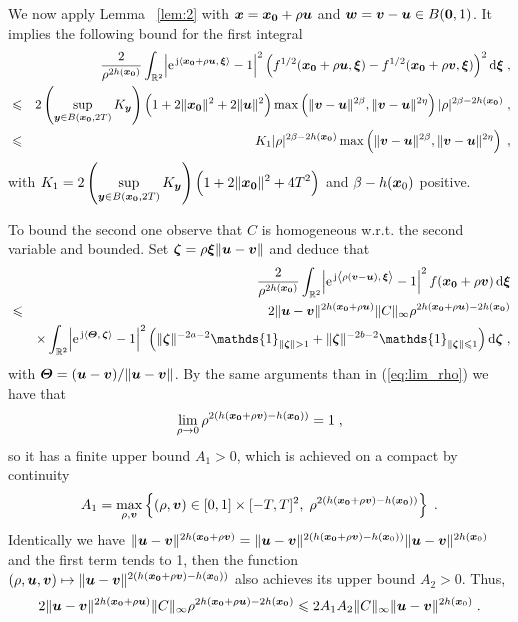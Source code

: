 \documentclass{elsarticle}
\begin{document}
We now apply Lemma~ \ref{lem:2} with $\bm{x}=\bm{x_0}+\rho\bm{u}$ and $\bm{w}=\bm{v}-\bm{u}\in B(\bm{0},1)$. It implies the following bound for the first integral
\begin{eqnarray}
&&\frac{2}{\rho^{2h(\bm{x_0})}}\int_{ \mathbb{R}^2}^{} \abs{\mathrm{e}^{\, \mathrm{j} \left \langle \bm{x_0}+\rho \bm{u},\, \bm{\xi}\right \rangle}-1}^2\left(f^{1/2}(\bm{x_0}+\rho \bm{u},\bm{\xi})-f^{1/2}(\bm{x_0}+\rho \bm{v},\bm{\xi})\right)^2\mathop{}\mathopen{}\mathrm{d} \bm{\xi}\;,\nonumber\\
&\leqslant& 2\left(\sup_{\bm{y}\in B(\bm{x_0},2T)}K_{\bm{y}}\right)\left(1+2\|\bm{x_0}\|^2+2\|\bm{u}\|^2\right)\max\left(\|\bm{v}-\bm{u}\|^{2\beta},\|\bm{v}-\bm{u}\|^{2\eta}\right)|\rho|^{2\beta-2h(\bm{x_0})}\;,\nonumber\\
&\leqslant & K_1 |\rho|^{2\beta-2h(\bm{x_0})} \max\left(\|\bm{v}-\bm{u}\|^{2\beta},\|\bm{v}-\bm{u}\|^{2\eta}\right)\;,\label{e:K1}
\end{eqnarray}
with $\displaystyle K_1=2\left(\sup_{\bm{y}\in B(\bm{x_0},2T)}K_{\bm{y}}\right)\left(1+2\|\bm{x_0}\|^2+4T^2\right)$ and $\beta-h(\bm{x}_0)$ positive.


To bound the second one observe that $C$ is homogeneous w.r.t. the second variable and bounded. Set $\bm{\zeta}=\rho\bm{\xi}\|\bm{u}-\bm{v}\|$ and deduce that
\begin{eqnarray*}
&& \frac{2}{\rho^{2h(\vect{x_0})}} \int_{ \mathbb{R}^2} \abs{\expj{\ip{\rho (\vect{v}-\vect{u})}{\vect{\xi}}}-1}^2 f(\vect{x_0}+\rho \vect{v})\diff \vect{\xi}\\
&\leq& 2\|\vect{u}-\vect{v}\|^{2h(\vect{x_0}+\rho \vect{u})}\|C\|_\infty \rho^{2h(\vect{x_0}+\rho\vect{u})-2h(\vect{x_0})}\\
&&\times \int_{ \mathbb{R}^2} \abs{\expj{\ip{\vect{\Theta}}{\vect{\zeta}}}-1}^2\left(\|\vect{\zeta}\|^{-2a-2} \mathds{1}_{\|\vect{\zeta}\|>1}+\|\vect{\zeta}\|^{-2b-2} \mathds{1}_{\|\vect{\zeta}\|\leq 1}\right)\diff \vect{\zeta}\;,
\end{eqnarray*}
with $\bm{\Theta}=(\bm{u}-\bm{v})/\|\bm{u}-\bm{v}\|$. By the same arguments than in (\ref{eq:lim_rho}) we have that 
\[
\lim_{\rho\to 0} \rho^{2(h(\bm{x_0}+\rho \bm{v})-h(\bm{x_0}))}=1\;,
\]
so it has a finite upper bound $A_1>0$, which is achieved on a compact by continuity
\[
A_1=\max_{\rho, \bm{v}} \left\{(\rho,\bm{v})\in [0,1]\times [-T,T]^2,\; \rho^{2(h(\bm{x_0}+\rho \bm{v})-h(\bm{x_0}))}\right\}\;.
\]
Identically we have $\lVert \bm{u}-\bm{v}\rVert^{2h(\bm{x_0}+\rho \bm{v})}=\lVert \bm{u}-\bm{v}\rVert^{2(h(\bm{x_0}+\rho \bm{v})-h(\bm{x}_0))}\lVert \bm{u}-\bm{v}\rVert^{2h(\bm{x}_0)}$ and the first term tends to 1, then the function $(\rho,\bm{u},\bm{v})\mapsto  \lVert \bm{u}-\bm{v}\rVert^{2(h(\bm{x_0}+\rho \bm{v})-h(\bm{x}_0))}$ also achieves its upper bound $A_2>0$. Thus, 
\[
2\|\bm{u}-\bm{v}\|^{2h(\bm{x_0}+\rho \bm{u})}\|C\|_\infty \rho^{2h(\bm{x_0}+\rho\bm{u})-2h(\bm{x_0})}\leqslant 2A_1A_2\|C\|_\infty \lVert \bm{u}-\bm{v}\rVert^{2h(\bm{x}_0)}\;.
\]   
\end{document}
